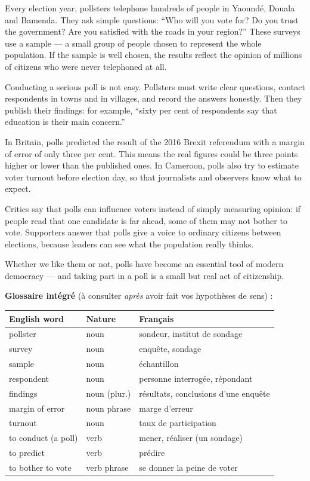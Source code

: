 \documentclass[11pt]{article}
\begin{document}
\begin{textebox}
Every election year, pollsters telephone hundreds of people in Yaoundé, Douala and Bamenda. They ask simple questions: “Who will you vote for? Do you trust the government? Are you satisfied with the roads in your region?” These surveys use a sample — a small group of people chosen to represent the whole population. If the sample is well chosen, the results reflect the opinion of millions of citizens who were never telephoned at all.

Conducting a serious poll is not easy. Pollsters must write clear questions, contact respondents in towns and in villages, and record the answers honestly. Then they publish their findings: for example, “sixty per cent of respondents say that education is their main concern.”

In Britain, polls predicted the result of the 2016 Brexit referendum with a margin of error of only three per cent. This means the real figures could be three points higher or lower than the published ones. In Cameroon, polls also try to estimate voter turnout before election day, so that journalists and observers know what to expect.

Critics say that polls can influence voters instead of simply measuring opinion: if people read that one candidate is far ahead, some of them may not bother to vote. Supporters answer that polls give a voice to ordinary citizens between elections, because leaders can see what the population really thinks.

Whether we like them or not, polls have become an essential tool of modern democracy — and taking part in a poll is a small but real act of citizenship.
\end{textebox}

\textbf{Glossaire intégré} (à consulter \emph{après} avoir fait vos hypothèses de sens) :

\begin{center}
\begin{tabularx}{\linewidth}{|l|l|X|}
\hline
\rowcolor{popblueL} English word & Nature & Français \\
\hline
pollster & noun & sondeur, institut de sondage \\
\hline
survey & noun & enquête, sondage \\
\hline
sample & noun & échantillon \\
\hline
respondent & noun & personne interrogée, répondant \\
\hline
findings & noun (plur.) & résultats, conclusions d'une enquête \\
\hline
margin of error & noun phrase & marge d'erreur \\
\hline
turnout & noun & taux de participation \\
\hline
to conduct (a poll) & verb & mener, réaliser (un sondage) \\
\hline
to predict & verb & prédire \\
\hline
to bother to vote & verb phrase & se donner la peine de voter \\
\hline
\end{tabularx}
\end{center}
\end{document}
